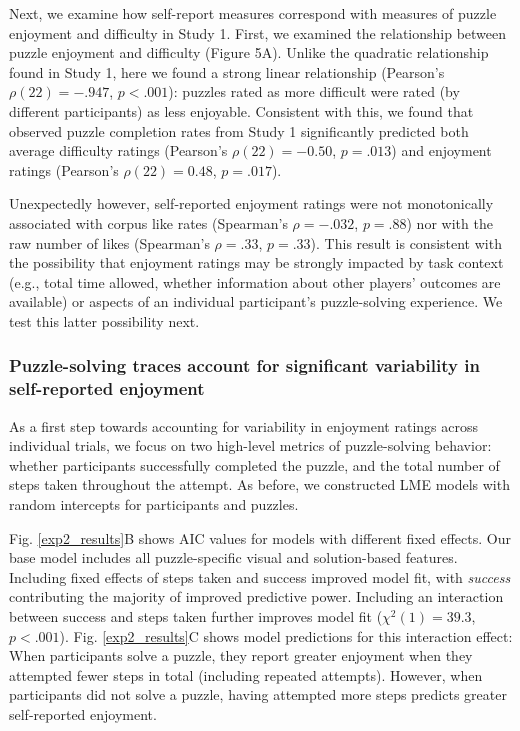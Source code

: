 \documentclass[10pt,letterpaper]{article}
\begin{document}
Next, we examine how self-report measures correspond with measures of puzzle enjoyment and difficulty in Study 1. First, we examined the relationship between puzzle enjoyment and difficulty (Figure 5A). Unlike the quadratic relationship found in Study 1, here we found a strong linear relationship (Pearson's $\rho(22)=-.947$, $p<.001$): puzzles rated as more difficult were rated (by different participants) as less enjoyable. Consistent with this, we found that observed puzzle completion rates from Study 1 significantly predicted both average difficulty ratings (Pearson's $\rho(22)=-0.50$, $p=.013$) and enjoyment ratings (Pearson's $\rho(22)=0.48$, $p = .017$). 

Unexpectedly however, self-reported enjoyment ratings were not monotonically associated with corpus like rates (Spearman's $\rho=-.032$, $p=.88$) nor with the raw number of likes (Spearman's $\rho=.33$, $p=.33$). This result is consistent with the possibility that enjoyment ratings may be strongly impacted by task context (e.g., total time allowed, whether information about other players' outcomes are available) or aspects of an individual participant's puzzle-solving experience. We test this latter possibility next.

\subsubsection{Puzzle-solving traces account for significant variability in self-reported enjoyment}
As a first step towards accounting for variability in enjoyment ratings across individual trials, we focus on two high-level metrics of puzzle-solving behavior: whether participants successfully completed the puzzle, and the total number of steps taken throughout the attempt. As before, we constructed LME models with random intercepts for participants and puzzles. 

Fig. \ref{exp2_results}B shows AIC values for models with different fixed effects. Our base model includes all puzzle-specific visual and solution-based features. Including fixed effects of steps taken and success improved model fit, with \textit{success} contributing the majority of improved predictive power. Including an interaction between success and steps taken further improves model fit ($\chi^2(1)=39.3$, $p < .001$). Fig. \ref{exp2_results}C shows model predictions for this interaction effect: 
When participants solve a puzzle, they report greater enjoyment when they attempted fewer steps in total (including repeated attempts). However, when participants did not solve a puzzle, having attempted more steps predicts greater self-reported enjoyment. 
\end{document}
